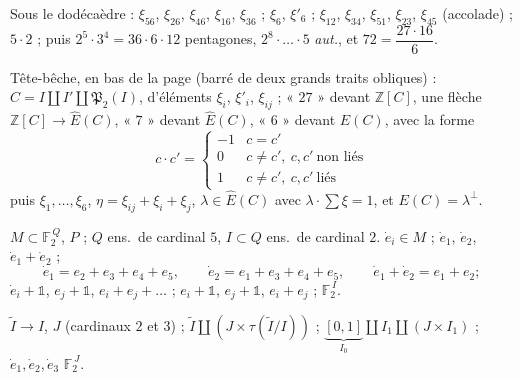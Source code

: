 \documentclass[11pt,a4paper]{article}
\begin{document}
Sous le dodécaèdre : $\xi_{56}$, $\xi_{26}$, $\xi_{46}$, $\xi_{16}$, $\xi_{36}$ ; $\xi_6$, $\xi'_6$ ; $\xi_{12}$, $\xi_{34}$, $\xi_{51}$, $\xi_{23}$, $\xi_{45}$ (accolade) ; $5\cdot2$ ; puis $2^5\cdot3^4=36\cdot6\cdot12$ pentagones, $2^8\cdot\ldots\cdot5$ \emph{aut.}, et $72=\dfrac{27\cdot16}{6}$.

Tête-bêche, en bas de la page (barré de deux grands traits obliques) : $C=I\amalg I'\amalg\mathfrak{P}_2(I)$, d'éléments $\xi_i$, $\xi'_i$, $\xi_{ij}$ ; « $27$ » devant $\mathbb{Z}[C]$, une flèche $\mathbb{Z}[C]\to\hat E(C)$, « $7$ » devant $\hat E(C)$, « $6$ » devant $E(C)$, avec la forme
\[
c\cdot c'=\begin{cases}-1 & c=c'\\ 0 & c\neq c',\ c,c'\ \text{non liés}\\ 1 & c\neq c',\ c,c'\ \text{liés}\end{cases}
\]
puis $\xi_1,\ldots,\xi_6$, $\eta=\xi_{ij}+\xi_i+\xi_j$, $\lambda\in\hat E(C)$ avec $\lambda\cdot\sum\xi=1$, et $E(C)=\lambda^{\perp}$.


$M\subset\mathbb{F}_2^{\,Q}$, $P$ ; $Q$ ens.\ de cardinal $5$, $I\subset Q$ ens.\ de cardinal $2$. $\dot e_i\in M$ ; $\dot e_1$, $\dot e_2$, $\dot e_1+\dot e_2$ ;
\[
\dot e_1=e_2+e_3+e_4+e_5,\qquad \dot e_2=e_1+e_3+e_4+e_5,\qquad \dot e_1+\dot e_2=e_1+e_2 ;
\]
$\dot e_i+\mathbb{1}$, $e_j+\mathbb{1}$, $e_i+e_j+\ldots$ ; $e_i+\mathbb{1}$, $e_j+\mathbb{1}$, $e_i+e_j$ ; $\mathbb{F}_2^{\,I}$.

$\tilde I\to I$, $J$ (cardinaux $2$ et $3$) ; \struck{\ill{}} $\tilde I\amalg(J\times\tau(\tilde I/I))$ ; $\underbrace{[0,1]}_{I_0}\amalg I_1\amalg(J\times I_1)$ ; $\dot e_1,\dot e_2,\dot e_3$ \quad \struck{\ill{}} $\mathbb{F}_2^{\,J}$.
\end{document}
